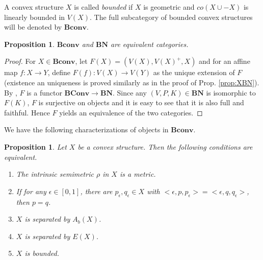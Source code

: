 \documentclass[12pt,letterpaper]{article}
\newtheorem{proposition}[lemma]{Proposition}
\newcommand{\ct}[1]{\mathbf{#1}}
\begin{document}
A convex structure $X$ is called \emph{bounded} if $X$ is geometric and $co(X\cup -X)$ is linearly bounded in $V(X)$.
 The full subcategory of  bounded convex structures will be denoted by $\ct{Bconv}$. 

\begin{proposition} $\ct{Bconv}$ and $\ct{BN}$ are equivalent categories.

\end{proposition}  
\begin{proof}

For $X\in \ct{Bconv}$, let  $F(X)=(V(X),V(X)^+,X)$ and for an affine map $f:X\to Y$, define $F(f): V(X)\to V(Y)$
as the unique extension of $F$ (existence an uniqueness is proved similarly as in the proof of Prop. \ref{prop:XBN}). By 
\cite[Prop. 5]{ovs}, $F$ is a functor $\ct{BConv}\to\ct{BN}$. Since any $(V,P,K)\in \ct{BN}$ is isomorphic to $F(K)$,  $F$ is surjective on objects and it is easy to see that it is also full and faithful. Hence 
 $F$ yields an equivalence of the two categories. 
 

\end{proof}


We have the following characterizations of objects in $\ct{Bconv}$.
\begin{proposition}\label{prop:bounded} Let $X$ be a  convex structure. Then the following conditions  are equivalent.
\begin{enumerate}
\item[(i)] The intrinsic semimetric $\rho$ in $X$ is a metric.
\item[(ii)] If for any $\epsilon \in [0,1]$, there are $p_\epsilon,q_\epsilon\in X$ with $<\epsilon,p,p_\epsilon>=<\epsilon, q,q_\epsilon>$, then $p=q$. 
\item[(iii)] $X$ is separated by $A_b(X)$.
\item[(iv)] $X$ is separated by $E(X)$.
\item[(v)] $X$ is bounded.
\end{enumerate}

\end{proposition}
\end{document}
